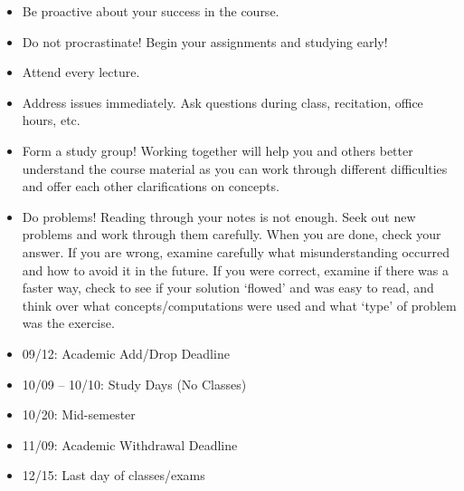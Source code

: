 \documentclass[11pt,letterpaper]{article}
\begin{document}
\begin{itemize} \itemsep=0.3ex
\item Be proactive about your success in the course.
\item Do not procrastinate! Begin your assignments and studying early!
\item Attend every lecture.
\item Address issues immediately. Ask questions during class, recitation, office hours, etc. 
\item Form a study group! Working together will help you and others better understand the course material as you can work through different difficulties and offer each other clarifications on concepts.
\item Do problems! Reading through your notes is not enough. Seek out new problems and work through them carefully. When you are done, check your answer. If you are wrong, examine carefully what misunderstanding occurred and how to avoid it in the future. If you were correct, examine if there was a faster way, check to see if your solution `flowed' and was easy to read, and think over what concepts/computations were used and what `type' of problem was the exercise.
\end{itemize}





\newpage





\begin{itemize} \itemsep=0.3ex
\item 09/12: Academic Add/Drop Deadline
\item 10/09 -- 10/10: Study Days (No Classes)
\item 10/20: Mid-semester
\item 11/09: Academic Withdrawal Deadline
\item 12/15: Last day of classes/exams
\end{itemize}
\sectionbreak







\end{document}

